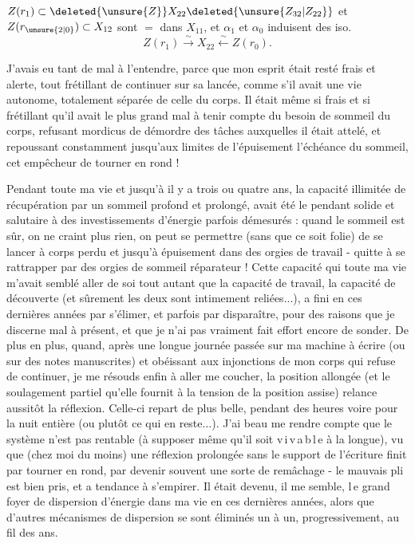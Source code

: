 
 $Z(r_1)\subset\deleted{\unsure{Z}} X_{22}\deleted{\unsure{Z_{32}|Z_{22}}}$ et $Z(r_{\unsure{2|0}})\subset X_{12}$ sont $=$  dans $X_{11}$, et $\alpha_1$ et $\alpha_0$ induisent des iso.
\[
Z(r_1)\xrightarrow{\sim}X_{22}\xleftarrow{\sim}Z(r_0).
\]


J'avais eu tant de mal à l'entendre, parce que mon esprit était resté frais et alerte, tout frétillant de continuer sur sa lancée, comme s'il avait une vie autonome, totalement séparée de celle du corps. Il était même si frais et si frétillant qu'il avait le plus grand mal à tenir compte du besoin de sommeil du corps, refusant mordicus de démordre des tâches auxquelles il était attelé, et repoussant constamment jusqu'aux limites de l'épuisement l'échéance du sommeil, cet empêcheur de tourner en rond !

Pendant toute ma vie et jusqu'à il y a trois ou quatre ans, la capacité illimitée de récupération par un sommeil profond et prolongé, avait été le pendant solide et salutaire à des investissements d'énergie parfois démesurés : quand le sommeil est sûr, on ne craint plus rien, on peut se permettre (sans que ce soit folie) de se lancer à corps perdu et jusqu'à épuisement dans des orgies de travail - quitte à se rattrapper par des orgies de sommeil réparateur ! Cette capacité qui toute ma vie m'avait semblé aller de soi tout autant que la capacité de travail, la capacité de découverte (et sûrement les deux sont intimement reliées...), a fini en ces dernières années par s'élimer, et parfois par disparaître, pour des raisons que je discerne mal à présent, et que je n'ai pas vraiment fait effort encore de sonder. De plus en plus, quand, après une longue journée passée sur ma machine à écrire (ou sur des notes manuscrites) et obéissant aux injonctions de mon corps qui refuse de continuer, je me résouds enfin à aller me coucher, la position allongée (et le soulagement partiel qu'elle fournit à la tension de la position assise) relance aussitôt la réflexion. Celle-ci repart de plus belle, pendant des heures voire pour la nuit entière (ou plutôt ce qui en reste...). J'ai beau me rendre compte que le système n'est pas rentable (à supposer même qu'il soit v\,i\,v\,a\,b\,l\,e à la longue), vu que (chez moi du moins) une réflexion prolongée sans le support de l'écriture finit par tourner en rond, par devenir souvent une sorte de remâchage - le mauvais pli est bien pris, et a tendance à s'empirer. Il était devenu, il me semble, l\,e grand foyer de dispersion d'énergie dans ma vie en ces dernières années, alors que d'autres mécanismes de dispersion se sont éliminés un à un, progressivement, au fil des ans.

